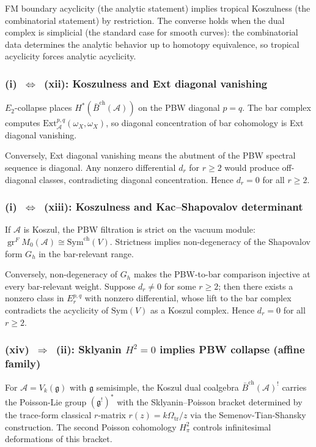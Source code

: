 \documentclass[11pt,reqno]{amsart}
\theoremstyle{definition}
\theoremstyle{remark}
\newcommand{\cA}{\mathcal{A}}
\newcommand{\barBch}{\bar{B}^{\mathrm{ch}}}
\newcommand{\Sym}{\mathrm{Sym}}
\newcommand{\Symch}{\mathrm{Sym}^{\mathrm{ch}}}
\newcommand{\Ext}{\mathrm{Ext}}
\newcommand{\fg}{\mathfrak{g}}
\newcommand{\Etwo}{E_2}
\DeclareMathOperator{\gr}{gr}
\numberwithin{equation}{section}
\begin{document}
FM boundary acyclicity (the analytic statement) implies tropical
Koszulness (the combinatorial statement) by restriction. The
converse holds when the dual complex is simplicial (the standard
case for smooth curves): the combinatorial data determines the
analytic behavior up to homotopy equivalence, so tropical acyclicity
forces analytic acyclicity.

\subsubsection*{\textup{(i)}~$\Leftrightarrow$~\textup{(xii):}
Koszulness and Ext diagonal vanishing}

$\Etwo$-collapse places $H^*(\barBch(\cA))$ on the PBW diagonal
$p = q$. The bar complex computes
$\Ext^{p,q}_\cA(\omega_X, \omega_X)$, so diagonal concentration
of bar cohomology is Ext diagonal vanishing.

Conversely, Ext diagonal vanishing means the abutment of the PBW
spectral sequence is diagonal. Any nonzero differential $d_r$ for
$r \geq 2$ would produce off-diagonal classes, contradicting
diagonal concentration. Hence $d_r = 0$ for all $r \geq 2$.

\subsubsection*{\textup{(i)}~$\Leftrightarrow$~\textup{(xiii):}
Koszulness and Kac--Shapovalov determinant}

If $\cA$ is Koszul, the PBW filtration is strict on the vacuum
module: $\gr^F M_0(\cA) \cong \Symch(V)$. Strictness implies
non-degeneracy of the Shapovalov form $G_h$ in the bar-relevant
range.

Conversely, non-degeneracy of $G_h$ makes the PBW-to-bar comparison
injective at every bar-relevant weight. Suppose $d_r \neq 0$ for
some $r \geq 2$; then there exists a nonzero class in
$E_r^{p,q}$ with nonzero differential, whose lift to the bar
complex contradicts the acyclicity of $\Sym(V)$ as a Koszul
complex. Hence $d_r = 0$ for all $r \geq 2$.

\subsubsection*{\textup{(xiv)}~$\Rightarrow$~\textup{(ii):}
Sklyanin $H^2 = 0$ implies PBW collapse (affine family)}

For $\cA = V_k(\fg)$ with $\fg$ semisimple, the Koszul dual
coalgebra $\barBch(\cA)^!$ carries the Poisson-Lie group
$(\fg^!)^*$ with the Sklyanin--Poisson bracket determined by the
trace-form classical $r$-matrix
$r(z)=k\Omega_{\mathrm{tr}}/z$ via the
Semenov-Tian-Shansky construction. The second Poisson cohomology
$H^2_\pi$ controls infinitesimal deformations of this bracket.
\end{document}
